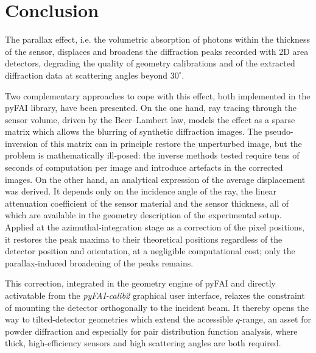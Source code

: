 \documentclass[preprint,pdf]{iucr}              %
\begin{document}
\section{Conclusion}
The parallax effect, i.e. the volumetric absorption of photons within the thickness of
the sensor, displaces and broadens the diffraction peaks recorded with 2D area
detectors, degrading the quality of geometry calibrations and of the extracted
diffraction data at scattering angles beyond $30^\circ$.

Two complementary approaches to cope with this effect, both implemented in the pyFAI
library, have been presented.
On the one hand, ray tracing through the sensor volume, driven by the Beer--Lambert
law, models the effect as a sparse matrix which allows the blurring of synthetic
diffraction images.
The pseudo-inversion of this matrix can in principle restore the unperturbed image, but
the problem is mathematically ill-posed: the inverse methods tested require tens of
seconds of computation per image and introduce artefacts in the corrected images.
On the other hand, an analytical expression of the average displacement was derived.
It depends only on the incidence angle of the ray, the linear attenuation coefficient
of the sensor material and the sensor thickness, all of which are available in the
geometry description of the experimental setup.
Applied at the azimuthal-integration stage as a correction of the pixel positions, it
restores the peak maxima to their theoretical positions regardless of the detector
position and orientation, at a negligible computational cost; only the
parallax-induced broadening of the peaks remains.

This correction, integrated in the geometry engine of pyFAI and directly activatable
from the \textit{pyFAI-calib2} graphical user interface, relaxes the constraint of
mounting the detector orthogonally to the incident beam.
It thereby opens the way to tilted-detector geometries which extend the accessible
$q$-range, an asset for powder diffraction and especially for pair distribution
function analysis, where thick, high-efficiency sensors and high scattering angles are
both required.


\end{document}
